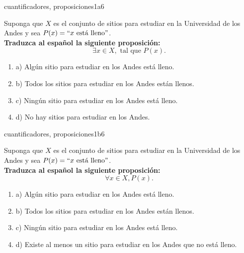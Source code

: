\documentclass{article}
\begin{document}
\begin{question}{25}{cuantificadores, proposiciones}{1}{a}{6}{
Suponga que $X$ es el conjunto de sitios para estudiar en la Universidad de los Andes y sea $P(x)=``x\text{ está lleno}"$.\\

\textbf{Traduzca al español la siguiente proposición:}
\[
\exists x \in X, \text{ tal que } P(x).
\]

\begin{enumerate}
   \item a) Algún sitio para estudiar en los Andes está lleno.  
   \item b) Todos los sitios para estudiar en los Andes están llenos.  
   \item c) Ningún sitio para estudiar en los Andes está lleno.  
   \item d) No hay sitios para estudiar en los Andes.  
\end{enumerate}
}
\end{question}

\begin{question}{26}{cuantificadores, proposiciones}{1}{b}{6}{
Suponga que $X$ es el conjunto de sitios para estudiar en la Universidad de los Andes y sea $P(x)=``x\text{ está lleno}"$.\\

\textbf{Traduzca al español la siguiente proposición:}
\[
\forall x \in X, P(x).
\]

\begin{enumerate}
   \item a) Algún sitio para estudiar en los Andes está lleno.  
   \item b) Todos los sitios para estudiar en los Andes están llenos.  
   \item c) Ningún sitio para estudiar en los Andes está lleno.  
   \item d) Existe al menos un sitio para estudiar en los Andes que no está lleno.  
\end{enumerate}
}
\end{question}
\end{document}

